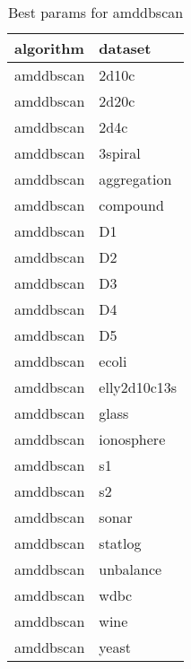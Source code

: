 \begin{table}[H]
\centering
\caption{Best params for amddbscan}
\label{tab:params:amddbscan}
\begin{tabular}{|l|l|}
\hline
algorithm & dataset \\
\hline
amddbscan & 2d10c \\
\hline
amddbscan & 2d20c \\
\hline
amddbscan & 2d4c \\
\hline
amddbscan & 3spiral \\
\hline
amddbscan & aggregation \\
\hline
amddbscan & compound \\
\hline
amddbscan & D1 \\
\hline
amddbscan & D2 \\
\hline
amddbscan & D3 \\
\hline
amddbscan & D4 \\
\hline
amddbscan & D5 \\
\hline
amddbscan & ecoli \\
\hline
amddbscan & elly2d10c13s \\
\hline
amddbscan & glass \\
\hline
amddbscan & ionosphere \\
\hline
amddbscan & s1 \\
\hline
amddbscan & s2 \\
\hline
amddbscan & sonar \\
\hline
amddbscan & statlog \\
\hline
amddbscan & unbalance \\
\hline
amddbscan & wdbc \\
\hline
amddbscan & wine \\
\hline
amddbscan & yeast \\
\hline
\end{tabular}
\end{table}